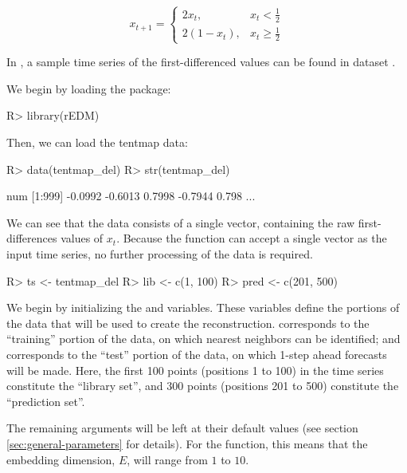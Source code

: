 \documentclass[article]{jss}
\begin{document}
\begin{equation*}
x_{t+1} =
\begin{cases}
2x_t, & x_t < \frac{1}{2}\\
2(1-x_t), & x_t \ge \frac{1}{2}
\end{cases}
\end{equation*}

In , a sample time series of the first-differenced values can be found in dataset .

We begin by loading the  package:
\begin{Schunk}
\begin{Sinput}
R> library(rEDM)
\end{Sinput}
\end{Schunk}

Then, we can load the tentmap data:
\begin{Schunk}
\begin{Sinput}
R> data(tentmap_del)
R> str(tentmap_del)
\end{Sinput}
\begin{Soutput}
 num [1:999] -0.0992 -0.6013 0.7998 -0.7944 0.798 ...
\end{Soutput}
\end{Schunk}

We can see that the data consists of a single vector, containing the raw first-differences values of $x_t$. Because the  function can accept a single vector as the input time series, no further processing of the data is required.

\begin{Schunk}
\begin{Sinput}
R> ts <- tentmap_del
R> lib <- c(1, 100)
R> pred <- c(201, 500)
\end{Sinput}
\end{Schunk}

We begin by initializing the  and  variables. These variables define the portions of the data that will be used to create the reconstruction.  corresponds to the ``training'' portion of the data, on which nearest neighbors can be identified; and  corresponds to the ``test'' portion of the data, on which 1-step ahead forecasts will be made. Here, the first 100 points (positions 1 to 100) in the time series constitute the ``library set'', and 300 points (positions 201 to 500) constitute the ``prediction set''.

The remaining arguments will be left at their default values (see section \ref{sec:general-parameters} for details). For the  function, this means that the embedding dimension, $E$, will range from $1$ to $10$.
\end{document}
